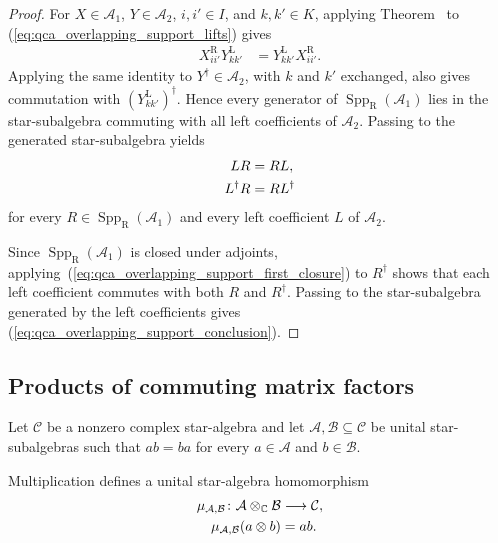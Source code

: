 \begin{proof}\leanok
    For $X\in\mathcal A_1$, $Y\in\mathcal A_2$, $i,i'\in I$, and
    $k,k'\in K$, applying
    Theorem~\cite[``Middle-factor coefficients of commuting overlapping operators'']{QICLean2026Blueprint} to
    (\ref{eq:qca_overlapping_support_lifts}) gives
    \begin{align}
        X^{\mathrm R}_{ii'}Y^{\mathrm L}_{kk'}
         & =Y^{\mathrm L}_{kk'}X^{\mathrm R}_{ii'}.
        \label{eq:qca_overlapping_support_coefficients}
    \end{align}
    Applying the same identity to $Y^\dagger\in\mathcal A_2$, with $k$ and
    $k'$ exchanged, also gives commutation with
    $(Y^{\mathrm L}_{kk'})^\dagger$.  Hence every generator of
    $\operatorname{Spp}_{\mathrm R}(\mathcal A_1)$ lies in the
    star-subalgebra commuting with all left coefficients of $\mathcal A_2$.
    Passing to the generated star-subalgebra yields
    \begin{align}
        LR          & =RL,
        \label{eq:qca_overlapping_support_first_closure} \\
        L^\dagger R & =RL^\dagger
        \notag
    \end{align}
    for every $R\in\operatorname{Spp}_{\mathrm R}(\mathcal A_1)$ and every
    left coefficient $L$ of $\mathcal A_2$.

    Since $\operatorname{Spp}_{\mathrm R}(\mathcal A_1)$ is closed under
    adjoints, applying~(\ref{eq:qca_overlapping_support_first_closure}) to $R^\dagger$ shows that
    each left coefficient commutes with both $R$ and $R^\dagger$.  Passing to
    the star-subalgebra generated by the left coefficients gives
    (\ref{eq:qca_overlapping_support_conclusion}).
\end{proof}

\subsection{Products of commuting matrix factors}

Let $\mathcal C$ be a nonzero complex star-algebra and let
$\mathcal A,\mathcal B\subseteq\mathcal C$ be unital star-subalgebras such
that $ab=ba$ for every $a\in\mathcal A$ and $b\in\mathcal B$.

\begin{definition}
    \label{def:qca_commuting_factor_multiplication}
    \leanok
    Multiplication defines a unital star-algebra homomorphism
    \begin{align}
        \mu_{\mathcal A,\mathcal B}
        \colon \mathcal A\otimes_{\mathbb C}\mathcal B
         & \longrightarrow \mathcal C, \notag \\
        \mu_{\mathcal A,\mathcal B}(a\otimes b)
         & =ab.
    \end{align}
\end{definition}

